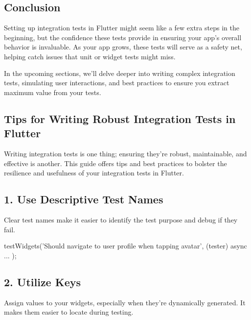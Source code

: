 \subsection*{Conclusion}

Setting up integration tests in Flutter might seem like a few extra steps in the beginning, but the confidence these tests provide in ensuring your app's overall behavior is invaluable. 
As your app grows, these tests will serve as a safety net, helping catch issues that unit or widget tests might miss.

In the upcoming sections, we'll delve deeper into writing complex integration tests, simulating user interactions, and best practices to ensure you extract maximum value from your tests.

\subsection{Tips for Writing Robust Integration Tests in Flutter}

Writing integration tests is one thing; ensuring they're robust, maintainable, and effective is another. 
This guide offers tips and best practices to bolster the resilience and usefulness of your integration tests in Flutter.

\subsection*{1. Use Descriptive Test Names}

Clear test names make it easier to identify the test purpose and debug if they fail.

\begin{dartcode}
testWidgets('Should navigate to user profile when tapping avatar', (tester) async { ... });
\end{dartcode}

\subsection*{2. Utilize Keys}

Assign  values to your widgets, especially when they're dynamically generated. It makes them easier to locate during testing.


